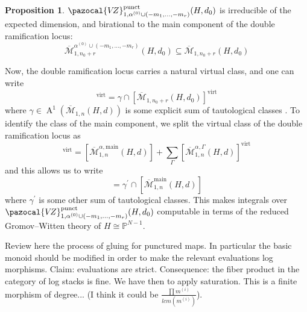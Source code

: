 \documentclass[11pt]{amsart}
\newcommand{\M}[4]{\overline{\mathcal{M}}_{#1,#2}(#3,#4)}
\newcommand{\PP}{\mathbb P}
\newcommand{\VZ}{\pazocal{V\!Z}}
\newcommand{\virt}[1]{[#1]^{\operatorname{virt}}}
\newcommand{\Achow}{\operatorname{A}}
\newcommand{\Mcal}{\mathcal{M}}
\newcommand{\ol}[1]{\overline{#1}}
\theoremstyle{definition}
\newtheorem{prop}[thm]{Proposition}
\theoremstyle{definition}
\begin{document}
\begin{prop} $\VZ^{\operatorname{punct}}_{1,\alpha^{(0)}\cup(-m_1,\ldots,-m_r)}(H,d_0)$ is irreducible of the expected dimension, and birational to the main component of the double ramification locus:
\begin{equation*} \ol{\Mcal}_{1,n_0+r}^{\alpha^{(0)}\cup(-m_1,\ldots,-m_r)}(H,d_0) \subseteq \ol{\Mcal}_{1,n_0+r}(H,d_0) \end{equation*}\end{prop}

Now, the double ramification locus carries a natural virtual class, and one can write
\begin{equation*} \virt{\ol{\Mcal}_{1,n_0+r}^{\alpha^{(0)}\cup(-m_1,\ldots,-m_r)}(H,d_0)} = \gamma \cap \virt{\ol{\Mcal}_{1,n_0+r}(H,d_0)} \end{equation*}
where $\gamma \in \Achow^1(\M{1}{n}{H}{d})$ is some explicit sum of tautological classes \cite{DRCBundle}. To identify the class of the main component, we split the virtual class of the double ramification locus as
\begin{equation*} \virt{\ol\Mcal^{\alpha}_{1,n}(H,d)} = [\ol\Mcal^{\alpha,\text{main}}_{1,n}(H,d)] + \sum_{\Gamma} \virt{\ol\Mcal^{\alpha,\Gamma}_{1,n}(H,d)} \end{equation*}
and this allows us to write
\begin{equation*} [\ol\Mcal^{\alpha,\text{main}}_{1,n}(H,d)] = \gamma^\prime \cap [\ol\Mcal^{\text{main}}_{1,n}(H,d)]\end{equation*}
where $\gamma^\prime$ is some other sum of tautological classes. This makes integrals over $\VZ^{\operatorname{punct}}_{1,\alpha^{(0)}\cup(-m_1,\ldots,-m_r)}(H,d_0)$ computable in terms of the reduced Gromov--Witten theory of $H\cong\PP^{N-1}$.

\newpage



Review here the process of gluing for punctured maps. In particular the basic monoid should be modified in order to make the relevant evaluations log morphisms. Claim: evaluations are strict. Consequence: the fiber product in the category of log stacks is fine. We have then to apply saturation. This is a finite morphism of degree... (I think it could be $\frac{\prod m^{(i)}}{lcm(m^{(i)})}$).
\end{document}
